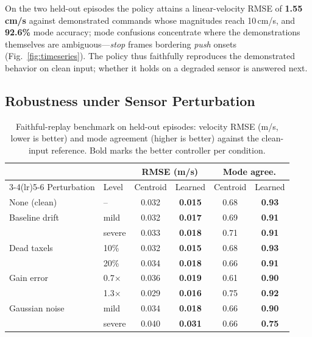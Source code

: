 \documentclass[runningheads]{llncs}
\begin{document}
On the two held-out episodes the policy attains a linear-velocity RMSE
of \textbf{1.55\,cm/s} against demonstrated commands whose magnitudes
reach 10\,cm/s, and \textbf{92.6\%} mode accuracy; mode confusions
concentrate where the demonstrations themselves are
ambiguous---\textit{stop} frames bordering \textit{push} onsets
(Fig.~\ref{fig:timeseries}). The policy thus faithfully reproduces the
demonstrated behavior on clean input; whether it holds on a degraded
sensor is answered next.

\subsection{Robustness under Sensor Perturbation}
\label{sec:results-robust}

\begin{table}[t]
\centering
\caption{Faithful-replay benchmark on held-out episodes: velocity RMSE
(m/s, lower is better) and mode agreement (higher is better) against the
clean-input reference. Bold marks the better controller per condition.}
\label{tab:robust}
\begin{tabular}{llcccc}
\toprule
& & \multicolumn{2}{c}{RMSE (m/s)} & \multicolumn{2}{c}{Mode agree.} \\
\cmidrule(lr){3-4}\cmidrule(lr){5-6}
Perturbation & Level & Centroid & Learned & Centroid & Learned \\
\midrule
None (clean)     & --      & 0.032 & \textbf{0.015} & 0.68 & \textbf{0.93} \\
\midrule
Baseline drift   & mild    & 0.032 & \textbf{0.017} & 0.69 & \textbf{0.91} \\
                 & severe  & 0.033 & \textbf{0.018} & 0.71 & \textbf{0.91} \\
\midrule
Dead taxels      & 10\%    & 0.032 & \textbf{0.015} & 0.68 & \textbf{0.93} \\
                 & 20\%    & 0.034 & \textbf{0.018} & 0.66 & \textbf{0.91} \\
\midrule
Gain error       & 0.7$\times$ & 0.036 & \textbf{0.019} & 0.61 & \textbf{0.90} \\
                 & 1.3$\times$ & 0.029 & \textbf{0.016} & 0.75 & \textbf{0.92} \\
\midrule
Gaussian noise   & mild    & 0.034 & \textbf{0.018} & 0.66 & \textbf{0.90} \\
                 & severe  & 0.040 & \textbf{0.031} & 0.66 & \textbf{0.75} \\
\bottomrule
\end{tabular}
\end{table}
\end{document}
